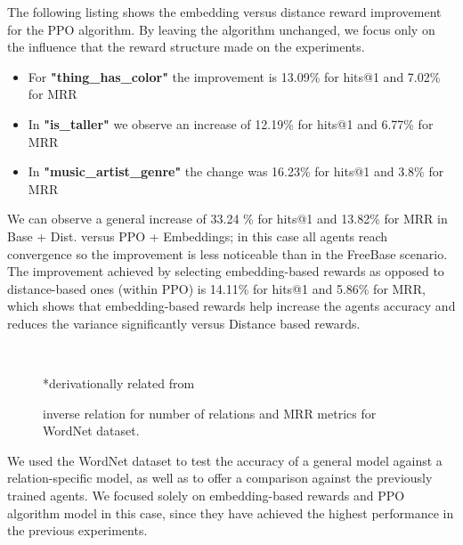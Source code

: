 The following listing shows the embedding versus distance reward improvement for the PPO algorithm. By leaving the algorithm unchanged, we focus only on the influence that the reward structure made on the experiments.

\begin{itemize}
    \item{For \textbf{"thing\_has\_color"} the improvement is 13.09\% for hits@1 and 7.02\% for MRR}
    
    \item{In \textbf{"is\_taller"} we observe an increase of 12.19\% for hits@1 and 6.77\% for MRR}
    
    \item{In \textbf{"music\_artist\_genre"} the change was 16.23\% for hits@1 and 3.8\% for MRR}
\end{itemize}

We can observe a general increase of 33.24 \% for hits@1 and 13.82\% for MRR in Base + Dist. versus PPO + Embeddings; in this case all agents reach convergence so the improvement is less noticeable than in the FreeBase scenario. The improvement achieved by selecting embedding-based rewards as opposed to distance-based ones (within PPO) is 14.11\% for hits@1 and 5.86\% for MRR, which shows that embedding-based rewards help increase the agents accuracy and reduces the variance significantly versus Distance based rewards.



\begin{figure}[!h]
    \centering
    \subfigure[WN18RR - is taller]{
        
        \label{fig:relnum}
    }~
    \subfigure[WN18RR - music]{
        
        \label{fig:relMRR}
    }\\
    
    \caption{inverse relation for number of relations and MRR metrics for WordNet dataset.}
    \label{fig:regrbarchart}
    \footnotesize{*derivationally related from}
\end{figure}

We used the WordNet dataset to test the accuracy of a general model against a relation-specific model, as well as to offer a comparison against the previously trained agents. We focused solely on embedding-based rewards and PPO algorithm model in this case, since they have achieved the highest performance in the previous experiments.

